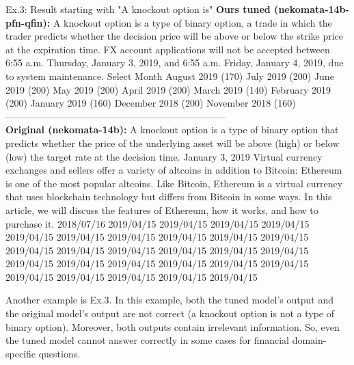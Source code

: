 \begin{brekableitembox}{Ex.3: Result starting with "A knockout option is"}
    {\bf Ours tuned (nekomata-14b-pfn-qfin):}
    A knockout option is a type of binary option, a trade in which the trader predicts whether the decision price will be above or below the strike price at the expiration time. FX account applications will not be accepted between 6:55 a.m. Thursday, January 3, 2019, and 6:55 a.m. Friday, January 4, 2019, due to system maintenance.
    Select Month August 2019 (170) July 2019 (200) June 2019 (200) May 2019 (200) April 2019 (200) March 2019 (140) February 2019 (200) January 2019 (160) December 2018 (200) November 2018 (160)\\
    ---------------------------------------------------------------------\\
    {\bf Original (nekomata-14b):}
    A knockout option is a type of binary option that predicts whether the price of the underlying asset will be above (high) or below (low) the target rate at the decision time. January 3, 2019 Virtual currency exchanges and sellers offer a variety of altcoins in addition to Bitcoin: Ethereum is one of the most popular altcoins. Like Bitcoin, Ethereum is a virtual currency that uses blockchain technology but differs from Bitcoin in some ways. In this article, we will discuss the features of Ethereum, how it works, and how to purchase it.
    2018/07/16 2019/04/15 2019/04/15 2019/04/15 2019/04/15 2019/04/15 2019/04/15 2019/04/15 2019/04/15 2019/04/15 2019/04/15 2019/04/15 2019/04/15 2019/04/15 2019/04/15 2019/04/15 2019/04/15 2019/04/15 2019/04/15 2019/04/15 2019/04/15 2019/04/15 2019/04/15 2019/04/15 2019/04/15 2019/04/15 2019/04/15 2019/04/15
\end{brekableitembox}

Another example is Ex.3. In this example, both the tuned model's output and the original model's output are not correct (a knockout option is not a type of binary option).
Moreover, both outputs contain irrelevant information.
So, even the tuned model cannot answer correctly in some cases for financial domain-specific questions.

